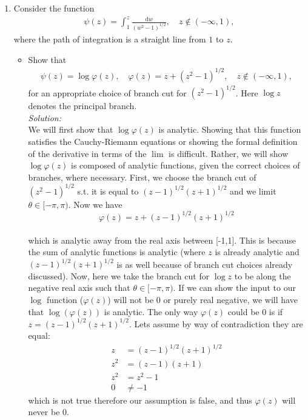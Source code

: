 \documentclass[10pt]{amsart}
\newcommand{\D}{\mathrm{d}}
\theoremstyle{nonumberplain}
\begin{document}
\begin{enumerate}[label={\bf {\arabic*}:}]
  \item Consider the function
    \begin{align*}
     \psi(z) = \int_1^z \frac{\D w}{(w^2 - 1)^{1/2}}, \quad z \not \in
      (-\infty, 1),
    \end{align*}
    where the path of integration is a straight line from $1$ to $z$.
    \begin{itemize}
   \item  Show that
    \begin{align*}
      \psi(z) = \log \varphi(z), \quad \varphi(z) = z + (z^2 -
      1)^{1/2}, \quad z \not \in
      (-\infty, 1),
    \end{align*}
   for an appropriate choice of branch cut for $(z^2 -
   1)^{1/2}$.  Here $\log z$ denotes the principal branch. \\
   \textit{Solution:} \\
   We will first show that $\log \varphi(z)$ is analytic.
   Showing that this function satisfies the Cauchy-Riemann equations or showing the formal definition of the derivative in terms of the $\lim$ is difficult. 
   Rather, we will show $\log \varphi(z)$ is composed of analytic functions, given the correct choices of branches, where necessary.
   First, we choose the branch cut of $(z^2 - 1)^{1/2}$ s.t. it is equal to $(z - 1)^{1/2} (z + 1)^{1/2}$ and we limit $\theta \in [-\pi, \pi)$.
   Now we have \\
   $$\varphi(z) = z + (z - 1)^{1/2}(z + 1)^{1/2}$$ \\
   which is analytic away from the real axis between [-1,1]. This is because the sum of analytic functions is analytic (where $z$ is already analytic and $(z - 1)^{1/2}(z + 1)^{1/2}$ is as well because of branch cut choices already discussed). Now, here we take the branch cut for $\log z$ to be along the negative real axis such that $\theta \in [-\pi, \pi)$. If we can show the input to our $\log$ function ($\varphi(z)$) will not be 0 or purely real negative, we will have that $\log(\varphi(z))$ is analytic. The only way $\varphi(z)$ could be 0 is if $z = (z - 1)^{1/2}(z + 1)^{1/2}$. Lets assume by way of contradiction they are equal:
   \begin{align*}
   z &= (z - 1)^{1/2}(z + 1)^{1/2} \\
   z^2 &= (z - 1)(z + 1) \\
   z^2 &= z^2 - 1 \\
   0 &\neq - 1
   \end{align*}
   which is not true therefore our assumption is false, and thus $\varphi(z)$ will never be 0.

\end{itemize}
\end{enumerate}
\end{document}
